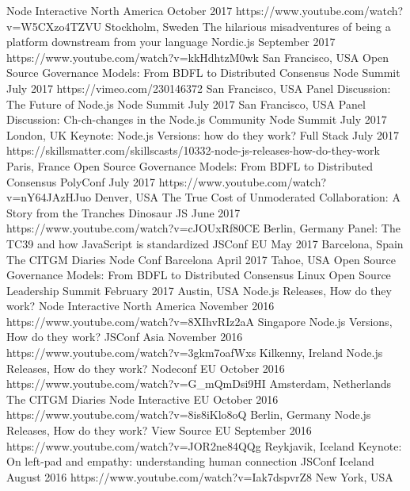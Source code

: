 \documentclass[10pt,a4paper,sans]{moderncv}   %
\begin{document}
  {Node Interactive North America}
  {October 2017}{}
  {https://www.youtube.com/watch?v=W5CXzo4TZVU}
\cventry
  {Stockholm, Sweden}
  {The hilarious misadventures of being a platform downstream from your language}
  {Nordic.js}
  {September 2017}{}
  {https://www.youtube.com/watch?v=kkHdhtzM0wk}
\cventry
  {San Francisco, USA}
  {Open Source Governance Models: From BDFL to Distributed Consensus}
  {Node Summit}
  {July 2017}{}
  {https://vimeo.com/230146372}
\cventry
  {San Francisco, USA}
  {Panel Discussion: The Future of Node.js}
  {Node Summit}
  {July 2017}{}
  {}
\cventry
  {San Francisco, USA}
  {Panel Discussion: Ch-ch-changes in the Node.js Community}
  {Node Summit}
  {July 2017}{}
  {}   
\cventry
  {London, UK}
  {Keynote: Node.js Versions: how do they work?}
  {Full Stack}
  {July 2017}{}
  {https://skillsmatter.com/skillscasts/10332-node-js-releases-how-do-they-work}
\cventry
  {Paris, France}
  {Open Source Governance Models: From BDFL to Distributed Consensus}
  {PolyConf}
  {July 2017}{}
  {https://www.youtube.com/watch?v=nY64JAzHJuo}
\cventry
  {Denver, USA}
  {The True Cost of Unmoderated Collaboration: A Story from the Tranches}
  {Dinosaur JS}
  {June 2017}{}
  {https://www.youtube.com/watch?v=cJOUxRf80CE}
\cventry
  {Berlin, Germany}
  {Panel: The TC39 and how JavaScript is standardized}
  {JSConf EU}
  {May 2017}{}
  {}
\cventry
  {Barcelona, Spain}
  {The CITGM Diaries}
  {Node Conf Barcelona}
  {April 2017}{}
  {}
\cventry
  {Tahoe, USA}
  {Open Source Governance Models: From BDFL to Distributed Consensus}
  {Linux Open Source Leadership Summit}
  {February 2017}{}
  {}
\cventry
  {Austin, USA}
  {Node.js Releases, How do they work?}
  {Node Interactive North America}
  {November 2016}{}
  {https://www.youtube.com/watch?v=8XIhvRIz2aA}
\cventry
  {Singapore}
  {Node.js Versions, How do they work?}
  {JSConf Asia}
  {November 2016}{}
  {https://www.youtube.com/watch?v=3gkm7oafWxs}
\cventry
  {Kilkenny, Ireland}
  {Node.js Releases, How do they work?}
  {Nodeconf EU}
  {October 2016}{}
  {https://www.youtube.com/watch?v=G\_mQmDsi9HI}
\cventry
  {Amsterdam, Netherlands}
  {The CITGM Diaries}
  {Node Interactive EU}
  {October 2016}{}
  {https://www.youtube.com/watch?v=8is8iKlo8oQ}
\cventry
  {Berlin, Germany}
  {Node.js Releases, How do they work?}
  {View Source EU}
  {September 2016}{}
  {https://www.youtube.com/watch?v=JOR2ne84QQg}
\cventry
  {Reykjavik, Iceland}
  {Keynote:  On left-pad and empathy: understanding human connection}
  {JSConf Iceland}
  {August 2016}{}
  {https://www.youtube.com/watch?v=Iak7dspvrZ8}
\cventry
  {New York, USA}
\end{document}
